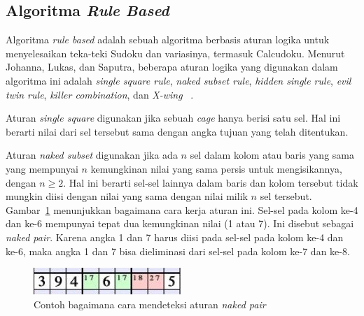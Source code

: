 \subsection{Algoritma \textit{Rule Based}}
\label{sec:rulebased}

Algoritma \textit{rule based} adalah sebuah algoritma berbasis aturan logika untuk menyelesaikan teka-teki Sudoku dan variasinya, termasuk Calcudoku. Menurut Johanna, Lukas, dan Saputra, beberapa aturan logika yang digunakan dalam algoritma ini adalah \textit{single square rule}, \textit{naked subset rule}, \textit{hidden single rule}, \textit{evil twin rule}, \textit{killer combination}, dan \textit{X-wing} ~\cite{johanna:12:hybrid}.

Aturan \textit{single square} digunakan jika sebuah \textit{cage} hanya berisi satu sel. Hal ini berarti nilai dari sel tersebut sama dengan angka tujuan yang telah ditentukan.

Aturan \textit{naked subset} digunakan jika ada \begin{math}n\end{math} sel dalam kolom atau baris yang sama yang mempunyai \begin{math}n\end{math} kemungkinan nilai yang sama persis untuk mengisikannya, dengan \begin{math}n \geq 2 \end{math}. Hal ini berarti sel-sel lainnya dalam baris dan kolom tersebut tidak mungkin diisi dengan nilai yang sama dengan nilai milik \begin{math}n\end{math} sel tersebut. Gambar~\ref{fig:hybrid2} menunjukkan bagaimana cara kerja aturan ini. Sel-sel pada kolom ke-4 dan ke-6 mempunyai tepat dua kemungkinan nilai (1 atau 7). Ini disebut sebagai \textit{naked pair}. Karena angka 1 dan 7 harus diisi pada sel-sel pada kolom ke-4 dan ke-6, maka angka 1 dan 7 bisa dieliminasi dari sel-sel pada kolom ke-7 dan ke-8.

\begin{figure}
\centering
\captionsetup{justification=centering}
\includegraphics[scale=1]{Gambar/HybridGenetic2}
\caption[Contoh bagaimana cara mendeteksi aturan  \textit{naked pair}  ~\cite{johanna:12:hybrid}]{Contoh bagaimana cara mendeteksi aturan  \textit{naked pair}  ~\cite{johanna:12:hybrid}}
\label{fig:hybrid2}
\end{figure}

